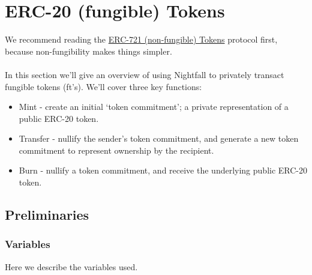 \documentclass{article}
\begin{document}
\newpage
\section{ERC-20 (fungible) Tokens}
\label{sec:20}
\secttoc
\mtcskip
\sectlof

\noindent
We recommend reading the \hyperref[sec:721]{ERC-721 (non-fungible) Tokens} protocol first, because non-fungibility makes things simpler.\\
\\
In this section we'll give an overview of using Nightfall to privately transact fungible tokens (ft's). We'll cover three key functions:
\begin{itemize}
  \item Mint - create an initial `token commitment'; a private representation of a public ERC-20 token.
  \item Transfer - nullify the sender's token commitment, and generate a new token commitment to represent ownership by the recipient.
  \item Burn - nullify a token commitment, and receive the underlying public ERC-20 token.
\end{itemize}


\subsection{Preliminaries}
\label{sec:20Preliminaries}
\newpage

\subsubsection{Variables}
\label{sec:20Variables}
Here we describe the variables used.
\end{document}
